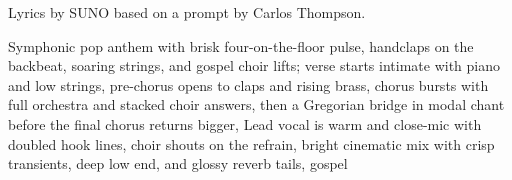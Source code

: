 
\begin{notes}
Lyrics by SUNO based on a prompt by Carlos Thompson.
\end{notes}
\begin{style}
Symphonic pop anthem with brisk four-on-the-floor pulse, handclaps on the backbeat, soaring strings, and gospel choir lifts; verse starts intimate with piano and low strings, pre-chorus opens to claps and rising brass, chorus bursts with full orchestra and stacked choir answers, then a Gregorian bridge in modal chant before the final chorus returns bigger, Lead vocal is warm and close-mic with doubled hook lines, choir shouts on the refrain, bright cinematic mix with crisp transients, deep low end, and glossy reverb tails, gospel
\end{style}
